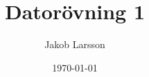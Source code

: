 \documentclass[a4paper,10pt]{article}
\begin{document}
    \title{Datorövning 1}
    \author{Jakob Larsson}
    \date{\today}
    \maketitle{}

    
    
\end{document}
